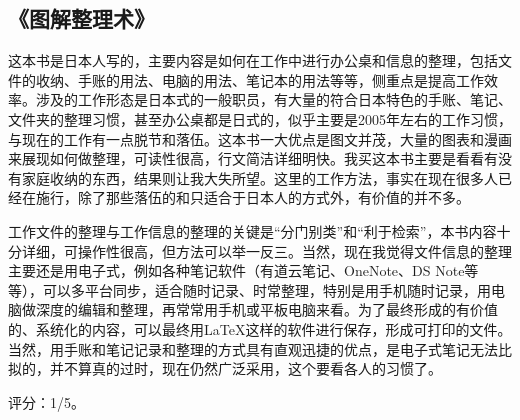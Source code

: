 \subsection{《图解整理术》}

这本书是日本人写的，主要内容是如何在工作中进行办公桌和信息的整理，包括文件的收纳、手账的用法、电脑的用法、笔记本的用法等等，侧重点是提高工作效率。涉及的工作形态是日本式的一般职员，有大量的符合日本特色的手账、笔记、文件夹的整理习惯，甚至办公桌都是日式的，似乎主要是2005年左右的工作习惯，与现在的工作有一点脱节和落伍。这本书一大优点是图文并茂，大量的图表和漫画来展现如何做整理，可读性很高，行文简洁详细明快。我买这本书主要是看看有没有家庭收纳的东西，结果则让我大失所望。这里的工作方法，事实在现在很多人已经在施行，除了那些落伍的和只适合于日本人的方式外，有价值的并不多。

工作文件的整理与工作信息的整理的关键是“分门别类”和“利于检索”，本书内容十分详细，可操作性很高，但方法可以举一反三。当然，现在我觉得文件信息的整理主要还是用电子式，例如各种笔记软件（有道云笔记、OneNote、DS Note等等），可以多平台同步，适合随时记录、时常整理，特别是用手机随时记录，用电脑做深度的编辑和整理，再常常用手机或平板电脑来看。为了最终形成的有价值的、系统化的内容，可以最终用\LaTeX 这样的软件进行保存，形成可打印的文件。当然，用手账和笔记记录和整理的方式具有直观迅捷的优点，是电子式笔记无法比拟的，并不算真的过时，现在仍然广泛采用，这个要看各人的习惯了。

评分：1/5。